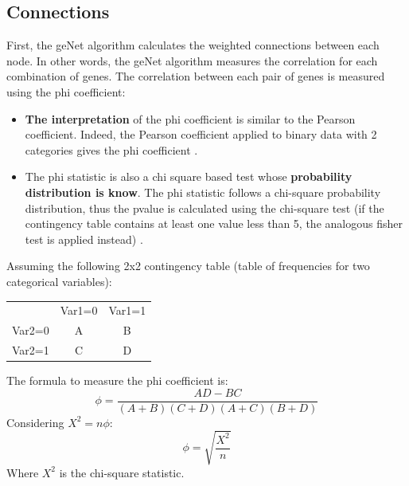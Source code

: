 \documentclass{article}
\begin{document}
\subsection{Connections}
First, the geNet algorithm calculates the weighted connections between each node. In other words, the geNet algorithm measures the correlation for each combination of genes.
The correlation between each pair of genes is measured using the phi coefficient:
\begin{itemize}
	\item \textbf{The interpretation} of the phi coefficient is similar to the Pearson coefficient. Indeed, the Pearson coefficient applied to binary data with 2 categories gives the phi coefficient \cite{Jones2019}.
	\item The phi statistic is also a chi square based test whose \textbf{probability distribution is know}.  The phi statistic follows a chi-square probability distribution, thus the pvalue is calculated using the chi-square test (if the contingency table contains at least one value less than 5, the analogous fisher test is applied instead) \cite{Jones2019}.
\end{itemize}
Assuming the following 2x2 contingency table (table of frequencies for two categorical variables):\\
\begin{center}
\begin{tabular}{ c c c }
  & Var1=0 & Var1=1 \\ 
 Var2=0 & A & B \\  
 Var2=1 & C & D    
\end{tabular}
\end{center}
The formula to measure the phi coefficient is:\\
\begin{equation}
\phi=\frac{AD-BC}{(A+B)(C+D)(A+C)(B+D)}
\end{equation}
Considering $X^2=n\phi$:\\
\begin{equation}
\phi=\sqrt{\frac{X^2}{n}}
\end{equation}
Where $X^2$ is the chi-square statistic.\\
\end{document}
